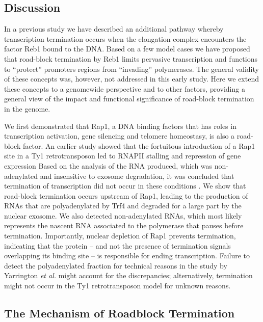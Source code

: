 \subsection{Discussion}


In a previous study we have described an additional pathway whereby transcription termination occurs when the elongation complex encounters the factor Reb1 bound to the DNA. Based on a few model cases we have proposed that road-block termination by Reb1 limits pervasive transcription and functions to “protect” promoters regions from “invading” polymerases. The general validity of these concepts was, however, not addressed in this early study. Here we extend these concepts to a genomewide perspective and to other factors, providing a general view of the impact and functional significance of road-block termination in the \cer{} genome.  

We first demonstrated that Rap1, a DNA binding factors that has roles in transcription activation, gene silencing and telomere homeostasy, is also a road-block factor. An earlier study showed that the fortuitous introduction of a Rap1 site in a Ty1 retrotransposon led to RNAPII stalling and repression of gene expression Based on the analysis of the RNA produced, which was non-adenylated and insensitive to exosome degradation, it was concluded that termination of transcription did not occur in these conditions \cite{yarrington:2012:novel}. We show that road-block termination occurs upstream of Rap1, leading to the production of RNAs that are polyadenylated by Trf4 and degraded for a large part by the nuclear exosome. We also detected non-adenylated RNAs, which most likely represents the nascent RNA associated to the polymerase that pauses before termination. Importantly, nuclear depletion of Rap1 prevents termination, indicating that the protein – and not the presence of termination signals overlapping its binding site – is responsible for ending transcription. Failure to detect the polyadenylated fraction for technical reasons in the study by Yarrington \textit{et al.} might account for the discrepancies; alternatively, termination might not occur in the Ty1 retrotransposon model for unknown reasons.


\singlespacing
\subsection*{The Mechanism of Roadblock Termination}
\doublespacing

